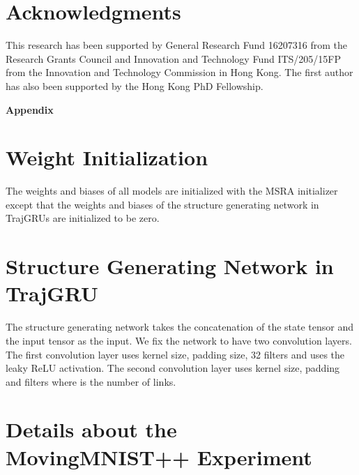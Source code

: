 \documentclass{article}
\begin{document}
\section*{Acknowledgments}
This research has been supported by General Research Fund 16207316 from the Research Grants Council and Innovation and Technology Fund ITS/205/15FP from the Innovation and Technology Commission in Hong Kong. The first author has also been supported by the Hong Kong PhD Fellowship.
\footnotesize
\let\oldbibliography\thebibliography
\renewcommand{\thebibliography}[1]{\oldbibliography{#1}
\setlength{\itemsep}{3pt}} 


\newpage
\appendix
\begin{Large}\textbf{Appendix}\end{Large}
\section{Weight Initialization}
The weights and biases of all models are initialized with the MSRA initializer~\cite{he2015delving} except that the weights and biases of the structure generating network in TrajGRUs are initialized to be zero.

\section{Structure Generating Network in TrajGRU}
The structure generating network takes the concatenation of the state tensor and the input tensor as the input. We fix the network to have two convolution layers. The first convolution layer uses  kernel size,  padding size, 32 filters and uses the leaky ReLU activation. The second convolution layer uses  kernel size,  padding and  filters where  is the number of links.
\section{Details about the MovingMNIST++ Experiment}
\end{document}
